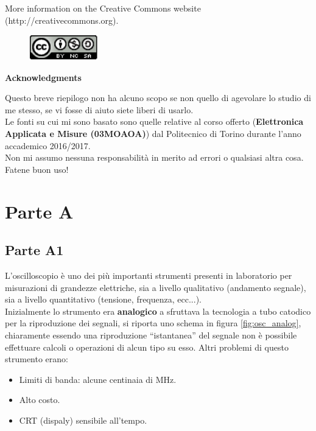\documentclass[12pt]{article}
\begin{document}
\noindent More information on the Creative Commons website (http://creativecommons.org).

\begin{figure}[h!]
  \centering
  \includegraphics[width=3cm]{images/license.png}
\end{figure}

{\noindent \Large \textbf{Acknowledgments}\bigskip}

Questo breve riepilogo non ha alcuno scopo se non quello di agevolare lo studio di me stesso, se vi fosse di aiuto siete liberi di usarlo.\\
Le fonti su cui mi sono basato sono quelle relative al corso offerto (\textbf{Elettronica Applicata e Misure (03MOAOA)}) dal Politecnico di Torino durante l'anno accademico 2016/2017.\\
Non mi assumo nessuna responsabilità in merito ad errori o qualsiasi altra cosa. Fatene buon uso!
\newpage

\section{Parte A}
\subsection{Parte A1}\label{A1} %
L'oscilloscopio è uno dei più importanti strumenti presenti in laboratorio per misurazioni di grandezze elettriche, sia a livello qualitativo (andamento segnale), sia a livello quantitativo (tensione, frequenza, ecc...).\\
Inizialmente lo strumento era \textbf{analogico} a sfruttava la tecnologia a tubo catodico per la riproduzione dei segnali, si riporta uno schema in figura \ref{fig:osc_analog}, chiaramente essendo una riproduzione ``istantanea'' del segnale non è possibile effettuare calcoli o operazioni di alcun tipo su esso. Altri problemi di questo strumento erano:
\begin{itemize}
  \item Limiti di banda: alcune centinaia di MHz.
  \item Alto costo.
  \item CRT (dispaly) sensibile all'tempo.
\end{itemize}
\end{document}
